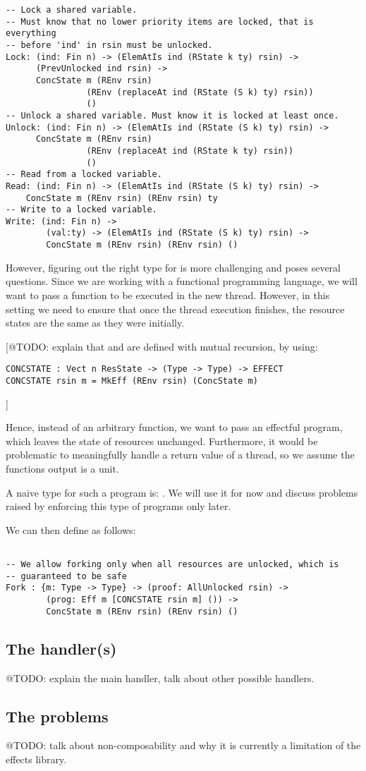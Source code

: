 \begin{verbatim}
-- Lock a shared variable.
-- Must know that no lower priority items are locked, that is everything
-- before 'ind' in rsin must be unlocked.
Lock: (ind: Fin n) -> (ElemAtIs ind (RState k ty) rsin) ->
      (PrevUnlocked ind rsin) ->
      ConcState m (REnv rsin)
                (REnv (replaceAt ind (RState (S k) ty) rsin))
                ()
-- Unlock a shared variable. Must know it is locked at least once.
Unlock: (ind: Fin n) -> (ElemAtIs ind (RState (S k) ty) rsin) ->
      ConcState m (REnv rsin)
                (REnv (replaceAt ind (RState k ty) rsin))
                ()
-- Read from a locked variable.
Read: (ind: Fin n) -> (ElemAtIs ind (RState (S k) ty) rsin) ->
    ConcState m (REnv rsin) (REnv rsin) ty
-- Write to a locked variable.
Write: (ind: Fin n) ->
        (val:ty) -> (ElemAtIs ind (RState (S k) ty) rsin) ->
        ConcState m (REnv rsin) (REnv rsin) ()
\end{verbatim}

However, figuring out the right type for  is more challenging and
poses several questions. Since we are working with a functional programming
language, we will want to pass a function to be executed in the new thread.
However, in this setting we need to ensure that once the thread execution
finishes, the resource states are the same as they were initially.

[@TODO: explain that  and  are defined with
mutual recursion, by using:
\begin{verbatim}
CONCSTATE : Vect n ResState -> (Type -> Type) -> EFFECT
CONCSTATE rsin m = MkEff (REnv rsin) (ConcState m)
\end{verbatim}
]

Hence, instead of an arbitrary function, we want to pass an effectful program,
which leaves the state of resources unchanged. Furthermore, it would be problematic to
meaningfully handle a return value of a thread, so we assume the functions
output is a unit.

A naive type for such a program is: . We will
use it for now and discuss problems raised by enforcing this type of programs
only later.

We can then define  as follows:

\begin{verbatim}

-- We allow forking only when all resources are unlocked, which is
-- guaranteed to be safe
Fork : {m: Type -> Type} -> (proof: AllUnlocked rsin) ->
        (prog: Eff m [CONCSTATE rsin m] ()) ->
        ConcState m (REnv rsin) (REnv rsin) ()

\end{verbatim}


\subsection{The handler(s)}

@TODO: explain the main handler, talk about other possible handlers.

\subsection{The problems}

@TODO: talk about non-composability and why it is currently a limitation of the
effects library.
